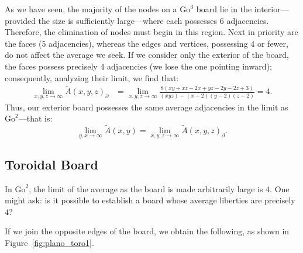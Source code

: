 As we have seen, the majority of the nodes on a \(\mathrm{Go}^{3}\) board lie in the interior—provided the size is sufficiently large—where each possesses $6$ adjacencies. Therefore, the elimination of nodes must begin in this region. Next in priority are the faces ($5$ adjacencies), whereas the edges and vertices, possessing $4$ or fewer, do not affect the average we seek. If we consider only the exterior of the board, the faces possess precisely $4$ adjacencies (we lose the one pointing inward); consequently, analyzing their limit, we find that:
\begin{align*}
	\lim_{x,y,z\to\infty} \tilde{A}(x,y,z)_{\partial}&=
	\lim_{x,y,z\to\infty}\frac{8 (x y + x z - 2 x + y z - 2 y - 2 z + 3)}{(xyz)-(x-2)(y-2)(z-2)}=4.
\end{align*}
Thus, our exterior board possesses the same average adjacencies in the limit as \(\mathrm{Go}^{2}\)—that is:
 $$\lim_{y,x\to\infty}  \tilde{A}(x,y)= \lim_{x,y,z\to\infty} \tilde{A}(x,y,z)_{\partial}.$$


\subsection{Toroidal Board}
\label{key:sectoro}
In \(\mathrm{Go}^{2}\), the limit of the average as the board is made arbitrarily large is $4$. One might ask: is it possible to establish a board whose average liberties are precisely $4$?

If we join the opposite edges of the board, we obtain the following, as shown in Figure~\ref{fig:plano_toro1}.

